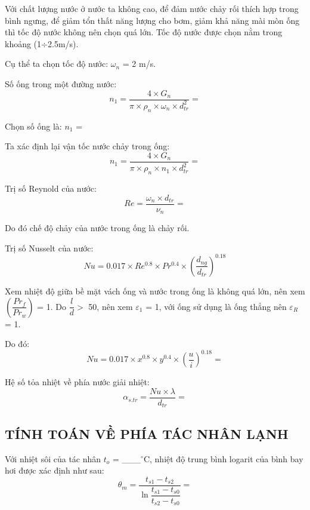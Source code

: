 Với chất lượng nước ở nước ta không cao, để đảm nước chảy rối thích hợp trong bình ngưng, để giảm tổn thất năng lượng cho bơm, giảm khả năng mài mòn ống thì tốc độ nước không nên chọn quá lớn. Tốc độ nước được chọn nằm trong khoảng (1$\div$2.5m/s).

Cụ thể ta chọn tốc độ nước: $\omega_{n}$ = 2 m/s.

Số ống trong một đường nước:
\begin{equation*}
	n_{1} = \dfrac{4\times G_{n}}{\pi\times\rho_{n}\times\omega_{n}\times d_{tr}^2} = 
\end{equation*}

Chọn số ống là: $n_{1}$  = 

Ta xác định lại vận tốc nước chảy trong ống:
\begin{equation*}
	n_{1} = \dfrac{4\times G_{n}}{\pi\times\rho_{n}\times n_{1}\times d_{tr}^2} = 
\end{equation*}

Trị số Reynold của nước:
\begin{equation*}
	Re = \dfrac{\omega_{n}\times d_{tr}}{\nu_{n}} =
\end{equation*}

Do đó chế độ chảy của nước trong ống là chảy rối.

Trị số Nusselt của nước:
\begin{equation*}
	Nu = 0.017\times Re^{0.8}\times Pr^{0.4}\times\left(\dfrac{d_{ng}}{d_{tr}}\right)^{0.18}
\end{equation*}

Xem nhiệt độ giữa bề mặt vách ống và nước trong ống là không quá lớn, nên xem $\left(\dfrac{Pr_{f}}{Pr_{w}}\right)$ = 1. Do $\dfrac{l}{d} >$ 50, nên xem $\varepsilon_{1}$ = 1, với ống sử dụng là ống thẳng nên $\varepsilon_{R}$ = 1.

Do đó:
\begin{equation*}
	Nu = 0.017\times x^{0.8}\times y^{0.4}\times\left(\dfrac{u}{i}\right)^{0.18} = 
\end{equation*}

Hệ số tỏa nhiệt về phía nước giải nhiệt:
\begin{equation*}
	\alpha_{s.tr} = \dfrac{Nu\times\lambda}{d_{tr}} =
\end{equation*}

\subsection{TÍNH TOÁN VỀ PHÍA TÁC NHÂN LẠNH}
Với nhiệt sôi của tác nhân $t_{o}$ = \_\_\_$^{\circ}$C, nhiệt độ trung bình logarit của bình bay hơi được xác định như sau:
\begin{equation*}
	\theta_{m} = \dfrac{t_{s1} - t_{s2}}{\ln{\dfrac{t_{s1} - t_{s0}}{t_{s2} - t_{s0}}}} = 
\end{equation*}

